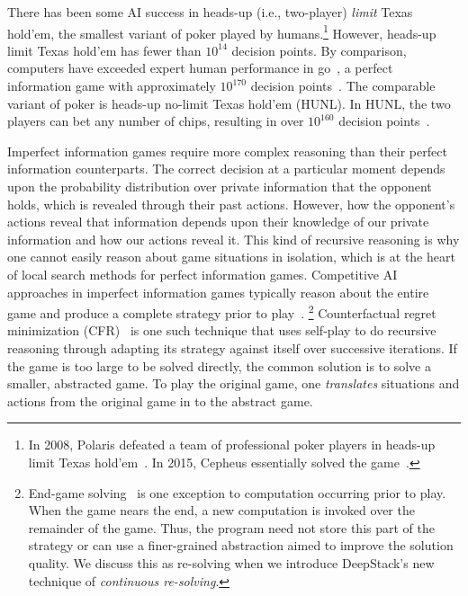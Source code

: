 \documentclass[12pt]{article}
\newcommand{\HUNL}{{HUNL}}
\begin{document}
There has been some AI success in heads-up (i.e., two-player) {\em limit} Texas hold'em, the smallest variant of poker played by humans.\footnote{In 2008, Polaris defeated a team of professional poker players in heads-up limit Texas hold'em~\cite{Wired08}.  In 2015, Cepheus essentially solved the game~\cite{Bowling15:Cepheus}.}  However, heads-up limit Texas hold'em has fewer than $10^{14}$ decision points.  By comparison, computers have exceeded expert human performance in go~\cite{Silver16:AlphaGo}, a perfect information game with approximately $10^{170}$ decision points~\cite{allis1994}.  The comparable variant of poker is heads-up no-limit Texas hold'em (\HUNL).  In \HUNL, the two players can bet any number of chips, resulting in over $10^{160}$ decision points~\cite{Johanson13:Sizes}.  

Imperfect information games require more complex reasoning than their perfect information counterparts. 
The correct decision at a particular moment depends upon the probability distribution over private information that the opponent holds, which is revealed through their past actions.
However, how the opponent's actions reveal that information depends upon their knowledge of our private information and how our actions reveal it.
This kind of recursive reasoning is why one cannot easily reason about game situations in isolation, which is at the heart of local search methods for perfect information games.  
Competitive AI approaches in imperfect information games typically reason about the entire game and produce a complete strategy prior to play~\cite{ZinkevichEtAl07,GilpinEtAl07}.%
\footnote{%
End-game solving~\cite{Ganzfried15:Endgame,cprg:cfrd,Moravcik16:Subgames} is one exception to  computation occurring prior to play.  When the game nears the end, a new computation is invoked over the remainder of the game.  Thus, the program need not store this part of the strategy or can use a finer-grained abstraction aimed to improve the solution quality.  We discuss this as re-solving when we introduce DeepStack's new technique of \emph{continuous re-solving}.}
Counterfactual regret minimization (CFR)~\cite{ZinkevichEtAl07,cprg:cfrd,Bowling15:Cepheus} is one such technique that uses self-play to do recursive reasoning through adapting its strategy against itself over successive iterations.  If the game is too large to be solved directly, the common solution is to solve a smaller, abstracted game.  To play the original game, one {\em translates} situations and actions from the original game in to the abstract game.
\end{document}
